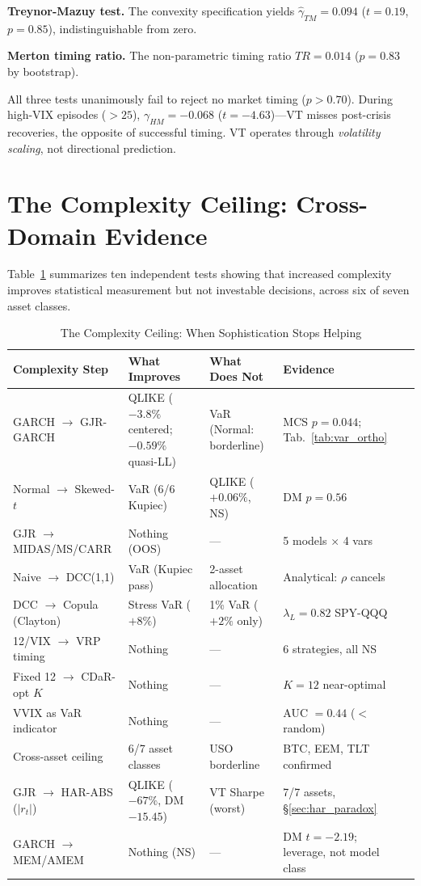 \textbf{Treynor-Mazuy test.} The \citet{treynor1966} convexity specification yields $\hat{\gamma}_{TM} = 0.094$ ($t = 0.19$, $p = 0.85$), indistinguishable from zero.

\textbf{Merton timing ratio.} The non-parametric timing ratio $TR = 0.014$ ($p = 0.83$ by bootstrap).

All three tests unanimously fail to reject no market timing ($p > 0.70$). During high-VIX episodes ($>25$), $\gamma_{HM} = -0.068$ ($t = -4.63$)---VT misses post-crisis recoveries, the opposite of successful timing. VT operates through \textit{volatility scaling}, not directional prediction.

\section{The Complexity Ceiling: Cross-Domain Evidence}
\label{sec:complexity_ceiling}

Table~\ref{tab:complexity_ceiling} summarizes ten independent tests showing that increased complexity improves statistical measurement but not investable decisions, across six of seven asset classes.

\begin{table}[H]
\centering
\caption{The Complexity Ceiling: When Sophistication Stops Helping}
\label{tab:complexity_ceiling}
\small
\begin{tabular}{lllll}
\hline
Complexity Step & What Improves & What Does Not & Evidence \\
\hline
GARCH $\to$ GJR-GARCH & QLIKE ($-3.8\%$ centered; $-0.59\%$ quasi-LL) & VaR (Normal: borderline) & MCS $p=0.044$; Tab.~\ref{tab:var_ortho} \\
Normal $\to$ Skewed-$t$ & VaR (6/6 Kupiec) & QLIKE ($+0.06\%$, NS) & DM $p=0.56$ \\
GJR $\to$ MIDAS/MS/CARR & Nothing (OOS) & --- & 5 models $\times$ 4 vars \\
Naive $\to$ DCC(1,1) & VaR (Kupiec pass) & 2-asset allocation & Analytical: $\rho$ cancels \\
DCC $\to$ Copula (Clayton) & Stress VaR ($+8\%$) & 1\% VaR ($+2\%$ only) & $\lambda_L=0.82$ SPY-QQQ \\
12/VIX $\to$ VRP timing & Nothing & --- & 6 strategies, all NS \\
Fixed 12 $\to$ CDaR-opt $K$ & Nothing & --- & $K=12$ near-optimal \\
VVIX as VaR indicator & Nothing & --- & AUC $= 0.44$ ($<$ random) \\
Cross-asset ceiling & 6/7 asset classes & USO borderline & BTC, EEM, TLT confirmed \\
GJR $\to$ HAR-ABS ($|r_t|$) & QLIKE ($-67\%$, DM $-15.45$) & VT Sharpe (worst) & 7/7 assets, \S\ref{sec:har_paradox} \\
GARCH $\to$ MEM/AMEM & Nothing (NS) & --- & DM $t = -2.19$; leverage, not model class \\
\hline
\end{tabular}
\end{table}

